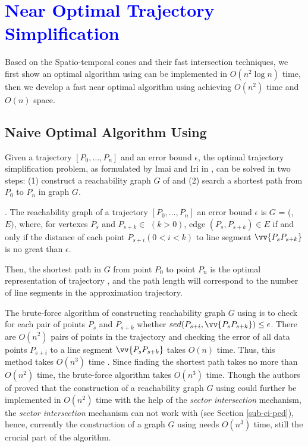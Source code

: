 \section{\textcolor{blue}{Near Optimal Trajectory Simplification}}
\label{sec-optimal}

Based on the Spatio-temporal cones and their fast intersection techniques, we first show an optimal algorithm using \sed can be implemented in $O(n^2\log n)$ time, then we develop a fast near optimal algorithm using \sed achieving $O(n^2)$ time and $O(n)$ space.

\subsection{Naive Optimal Algorithm Using \sed}

Given a trajectory ${[P_0, \ldots, P_n]}$ and an error bound $\epsilon$, the optimal trajectory simplification problem, as formulated by Imai and Iri in \cite{Imai:Optimal}, can be solved in two steps: (1) construct a reachability graph $G$ of  and (2) search a shortest path from $P_0$ to $P_{n}$ in graph $G$.

. The reachability graph of a trajectory ${[P_0, \ldots, P_n]}$ \wrt an error bound $\epsilon$ is $G$
= (, $E)$, where, for vertexes $P_s$ and $P_{s+k} \in$  $(k>0)$, edge $(P_s, P_{s+k}) \in E$ if and only if the distance of each point $P_{s+i} (0<i<k)$ to line segment $\vv{P_sP_{s+k}}$ is no great than $\epsilon$.

Then, the shortest path in $G$ from point $P_0$ to point $P_{n}$ is the optimal representation of trajectory , and the path length will correspond to the number of line segments in the approximation trajectory\cite{Imai:Optimal}. 


The brute-force algorithm of constructing reachability graph $G$ using \sed is to check for each pair of points $P_s$ and $P_{s+k}$ whether $sed(P_{s+i}, \vv{P_sP_{s+k}}) \le \epsilon$. 
There are $O(n^2)$ pairs of points in the trajectory and checking the error of all data points $P_{s+i}$ to a line segment $\vv{P_sP_{s+k}}$ takes $O(n)$ time. 
Thus, this method takes $O(n^3)$ time \cite{Imai:Optimal}. 
Since finding the shortest path takes no more than $O(n^2)$ time, the brute-force algorithm takes $O(n^3)$ time.
%
Though the authors of \cite{Chan:Optimal} proved that the construction of a reachability graph $G$ using \ped could further be implemented in $O(n^2)$ time with the help of the \textit{sector intersection} mechanism, the \textit{sector intersection} mechanism can not work with \sed (see Section \ref{sub-ci-ped}), hence, currently the construction of a graph $G$ using \sed needs $O(n^3)$ time, still the crucial part of the algorithm.
 
